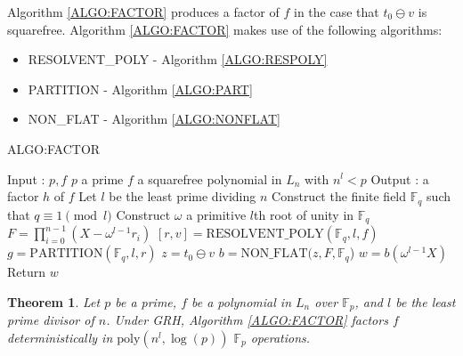 \documentclass{article}
\newcounter{dummy} \numberwithin{dummy}{section}
\theoremstyle{plain}
\newtheorem{thm}[dummy]{Theorem}
\theoremstyle{definition}
\def\Fp {{ \mathbb{F} _ {p} }}
\def\Fq {{ \mathbb{F} _ {q} }}
\def\poly {{ \mathrm{poly} }}
\begin{document}
		Algorithm \ref{ALGO:FACTOR} produces a factor of $f$ in the case that $t_0 \ominus v$ is squarefree. Algorithm \ref{ALGO:FACTOR} makes use of the following algorithms: 
		\begin{itemize}
    \item RESOLVENT\_POLY - Algorithm \ref{ALGO:RESPOLY} 
		\item PARTITION - Algorithm \ref{ALGO:PART} 
		\item NON\_FLAT - Algorithm \ref{ALGO:NONFLAT} 
		\end{itemize}
		\begin{singlespace}
		
    \begin{algorithm}[H]
		\DontPrintSemicolon
    \label{ALGO:FACTOR}	
    \caption{ALGO:FACTOR}
        Input : $p,f$ \;
				    \hspace{2mm} $p$ a prime \;
						\hspace{2mm} $f$ a squarefree polynomial in $L_n$ with $n^l < p$ \;
		    Output : a factor $h$ of $f$ \;		
				Let $l$ be the least prime dividing $n$ \;
				Construct the finite field $\Fq$ such that $q \equiv 1 \pmod l$ \;
				Construct $\omega$ a primitive $l$th root of unity in $\Fq$ \;
				$F=\prod_{i=0}^{n-1}{(X-\omega^{l-1} r_i)}$ \;
				$[r,v]=\textrm{RESOLVENT\_POLY}(\Fq,l,f)$ \;
				$g=\textrm{PARTITION}(\Fq, l, r)$ \;
        $z=t_0 \ominus v$ \;
				$b=\textrm{NON\_FLAT}(z,F,\Fq$) \;
				$w=b(\omega^{l-1}X)$ \;
				Return $w$ \;
		\end{algorithm}
		\end{singlespace}
		\vspace{5mm}		
			
		\begin{thm}
		\label{THM:almostRonyai}
		    Let $p$ be a prime, $f$ be a polynomial in $L_n$ over $\Fp$, and $l$ be the least prime divisor of $n$. Under GRH, Algorithm \ref{ALGO:FACTOR} factors $f$ deterministically in $\poly(n^l,\log(p))$ $\Fp$ operations. 
		\end{thm}
		
\end{document}
